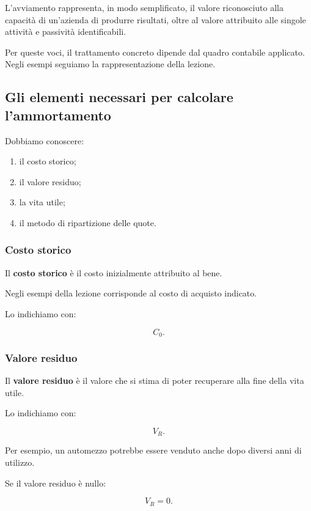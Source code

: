 \noindent L'avviamento rappresenta,
in modo semplificato,
il valore riconosciuto alla capacità
di un'azienda di produrre risultati,
oltre al valore attribuito
alle singole attività e passività identificabili.

\noindent Per queste voci,
il trattamento concreto dipende
dal quadro contabile applicato.
Negli esempi seguiamo
la rappresentazione della lezione.


\subsection{Gli elementi necessari
per calcolare l'ammortamento}

\noindent Dobbiamo conoscere:

\begin{enumerate}
    \item il costo storico;
    \item il valore residuo;
    \item la vita utile;
    \item il metodo di ripartizione delle quote.
\end{enumerate}


\subsubsection*{Costo storico}

\noindent Il \textbf{costo storico}
è il costo inizialmente attribuito al bene.

\noindent Negli esempi della lezione
corrisponde al costo di acquisto indicato.

\noindent Lo indichiamo con:

\[
C_0.
\]


\subsubsection*{Valore residuo}

\noindent Il \textbf{valore residuo}
è il valore che si stima
di poter recuperare
alla fine della vita utile.

\noindent Lo indichiamo con:

\[
V_R.
\]

\noindent Per esempio,
un automezzo potrebbe essere venduto
anche dopo diversi anni di utilizzo.

\noindent Se il valore residuo è nullo:

\[
V_R=0.
\]

